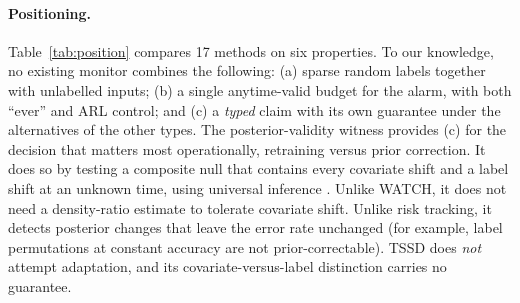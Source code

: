 \paragraph{Positioning.} Table~\ref{tab:position} compares 17 methods on six properties. To our knowledge, no existing monitor combines the following: (a) sparse random labels together with unlabelled inputs; (b) a single anytime-valid budget for the alarm, with both ``ever'' and ARL control; and (c) a \emph{typed} claim with its own guarantee under the alternatives of the other types. The posterior-validity witness provides (c) for the decision that matters most operationally, retraining versus prior correction. It does so by testing a composite null that contains every covariate shift and a label shift at an unknown time, using universal inference \citep{wasserman2020}. Unlike WATCH, it does not need a density-ratio estimate to tolerate covariate shift. Unlike risk tracking, it detects posterior changes that leave the error rate unchanged (for example, label permutations at constant accuracy are not prior-correctable). TSSD does \emph{not} attempt adaptation, and its covariate-versus-label distinction carries no guarantee.

